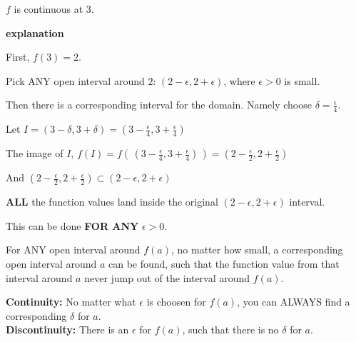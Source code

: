 \documentclass{ximera}
\begin{document}
\begin{example}
$f$ is continuous at $3$. 



\textbf{\textcolor{red!75!green}{explanation}} 

First, $f(3) = 2$. 


Pick ANY open interval around $2$:  $(2 - \epsilon, 2 + \epsilon)$, where $\epsilon > 0 $ is small. 

Then there is a corresponding interval for the domain. Namely choose $\delta = \frac{\epsilon}{4}$.

Let $I = (3 - \delta, 3 + \delta) = \left(3 - \frac{\epsilon}{4}, 3 + \frac{\epsilon}{4}\right)$


The image of $I$, $f(I) = f\left(\,\left(3 - \frac{\epsilon}{4}, 3 + \frac{\epsilon}{4}\right)\,\right) = \left(2 - \frac{\epsilon}{2}, 2 + \frac{\epsilon}{2}\right)$

And $\left(2 - \frac{\epsilon}{2}, 2 + \frac{\epsilon}{2}\right) \subset  (2 - \epsilon, 2 + \epsilon) $


\textbf{ALL} the function values land inside the original $(2 - \epsilon, 2 + \epsilon)$ interval.


This can be done \textbf{\textcolor{red!70!black}{FOR ANY}} $\epsilon > 0$. 


For ANY open interval around $f(a)$, no matter how small, a corresponding open interval around $a$ can be found, such that the function value from that interval around $a$ never jump out of the interval around $f(a)$.










\end{example}





\textbf{Continuity:} No matter what $\epsilon$ is choosen for $f(a)$, you can ALWAYS find a corresponding $\delta$ for $a$. \\



\textbf{Discontinuity:} There is an $\epsilon$ for $f(a)$, such that there is no $\delta$ for $a$. \\
\end{document}
